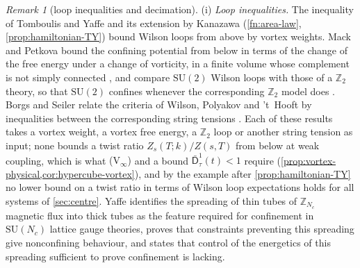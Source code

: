 \documentclass[11pt,a4paper]{amsart}
\theoremstyle{definition}
\theoremstyle{remark}
\newtheorem{remark}[theorem]{Remark}
\numberwithin{equation}{section}
\newcommand{\Z}{\mathbb{Z}}          %
\newcommand{\SU}{\mathrm{SU}}              %
\newcommand{\Zpart}[2]{Z(#1,#2)}           %
\begin{document}
\begin{remark}[loop inequalities and decimation]\label{rem:vortex-routes}
(i) \emph{Loop inequalities.} The inequality of Tomboulis and Yaffe \cite{tomboulis1985} and its extension by Kanazawa \cite{kanazawa2009} (\cref{fn:area-law}, \cref{prop:hamiltonian-TY}) bound Wilson loops from above by vortex weights. Mack and Petkova bound the confining potential from below in terms of the change of the free energy under a change of vorticity, in a finite volume whose complement is not simply connected \cite{mackpetkova1980}, and compare $\SU(2)$ Wilson loops with those of a $\Z_2$ theory, so that $\SU(2)$ confines whenever the corresponding $\Z_2$ model does \cite{mackpetkova1979}. Borgs and Seiler relate the criteria of Wilson, Polyakov and 't~Hooft by inequalities between the corresponding string tensions \cite{borgs1983}. Each of these results takes a vortex weight, a vortex free energy, a $\Z_2$ loop or another string tension as input; none bounds a twist ratio $Z_s(T;k)/\Zpart{s}{T}$ from below at weak coupling, which is what \textup{(V$_\infty$)} and a bound $\bar{\mathsf D}^1_\tau(t)<1$ require (\cref{prop:vortex-physical,cor:hypercube-vortex}), and by the example after \cref{prop:hamiltonian-TY} no lower bound on a twist ratio in terms of Wilson loop expectations holds for all systems of \cref{sec:centre}. Yaffe \cite{yaffe1980} identifies the spreading of thin tubes of $\Z_{N_c}$ magnetic flux into thick tubes as the feature required for confinement in $\SU(N_c)$ lattice gauge theories, proves that constraints preventing this spreading give nonconfining behaviour, and states that control of the energetics of this spreading sufficient to prove confinement is lacking.


\end{remark}
\end{document}
